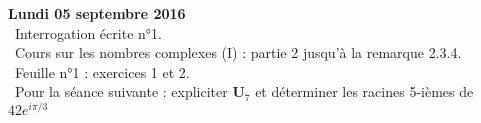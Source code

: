 \documentclass[12pt,a4paper]{article}
\begin{document}
% 
%  
%  
% 
% 

\noindent\textbf{Lundi 05 septembre 2016}\\
\bu\ Interrogation écrite n°1.\\
\bu\ Cours sur les nombres complexes (I) : partie 2 jusqu'à la remarque 2.3.4.\\
\bu\ Feuille n°1 : exercices 1 et 2.\\
\bu\ Pour la séance suivante : expliciter $\mathbf{U}_7$ et déterminer les racines 5-ièmes de $42 e^{i\pi/3}$\vspace{.4cm}\\
\end{document}
